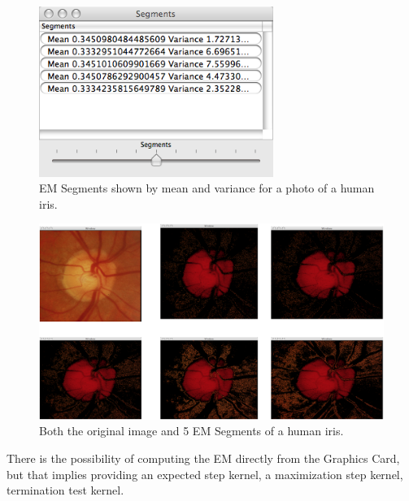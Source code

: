 \documentclass[11pt]{article}
\begin{document}
\begin{figure}[htbp] %
   \centering
   \includegraphics[width=3in]{segmentsPanel.png} 
   \caption{EM Segments shown by mean and variance for a photo of a human iris.}
   \label{segmentsPanel}
\end{figure}

\begin{figure}[htbp] %
   \centering
   \includegraphics[width=6in]{fiveEmSegments.png} 
   \caption{Both the original image and 5 EM Segments of a human iris. }
   \label{fiveEmSegments}
\end{figure}

There is the possibility of computing the EM directly from the Graphics Card, but that implies providing an expected step kernel, a maximization step kernel,  termination test kernel.  



\end{document}
